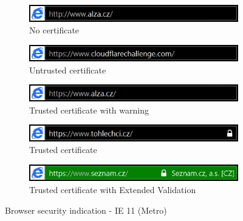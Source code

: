 \begin{figure}
  \begin{subfigure}[b]{\textwidth}
    \centering
    \includegraphics[scale=0.6]{images/browsers/iemetro-none.png}
    \caption{No certificate}
  \end{subfigure}
  \begin{subfigure}[b]{\textwidth}
    \centering
    \includegraphics[scale=0.6]{images/browsers/iemetro-untrusted.png}
    \caption{Untrusted certificate}
  \end{subfigure}
  \begin{subfigure}[b]{\textwidth}
    \centering
    \includegraphics[scale=0.6]{images/browsers/iemetro-warning.png}
    \caption{Trusted certificate with warning}
  \end{subfigure}
  \begin{subfigure}[b]{\textwidth}
    \centering
    \includegraphics[scale=0.6]{images/browsers/iemetro-dv.png}
    \caption{Trusted certificate}
  \end{subfigure}
  \begin{subfigure}[b]{\textwidth}
    \centering
    \includegraphics[scale=0.6]{images/browsers/iemetro-ev.png}
    \caption{Trusted certificate with Extended Validation}
  \end{subfigure}
  \caption{Browser security indication - IE 11 (Metro)}
\end{figure}

